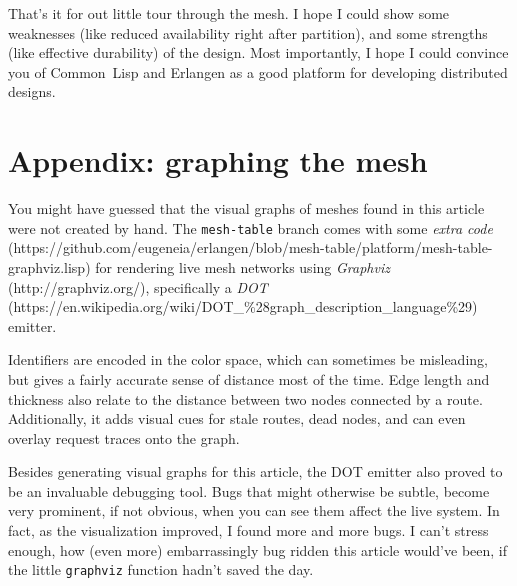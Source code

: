 \documentclass [a4paper,12pt,oneside]{article}\usepackage [paper=a4paper,left=37.5264mm,right=37.5264mm,top=37.5264mm,bottom=37.5264mm]{geometry}\usepackage {graphicx}\usepackage {tabularx}\usepackage {alltt}\usepackage {float}\usepackage [section]{placeins}\usepackage {titling}\setlength {\droptitle }{-4em}\pretitle {\begin {flushright}\bfseries \LARGE }\posttitle {\end {flushright}}\preauthor {\begin {flushright}}\postauthor {\end {flushright}}\predate {\begin {flushright}}\postdate {\end {flushright}}\usepackage [english]{babel}\usepackage [T1]{fontenc}\usepackage [utf8x]{inputenc}\usepackage {stmaryrd}\usepackage {amsfonts}\DeclareUnicodeCharacter {12314}{$\llbracket $}\DeclareUnicodeCharacter {12315}{$\rrbracket $}\DeclareUnicodeCharacter {9655}{$\rhd $}\newcommand \nobreakdash {\mbox {-}}\DeclareUnicodeCharacter {8209}{\nobreakdash }\usepackage [sc]{mathpazo}\linespread {1.05}\usepackage [font={small},labelformat=empty,labelsep=none]{caption}\tolerance=10000 \clubpenalty=10000 \widowpenalty=10000 \frenchspacing
\begin{document}
That’s it for out little tour through the mesh. I hope I could show some weaknesses (like reduced availability right after partition), and some strengths (like effective durability) of the design. Most importantly, I hope I could convince you of Common Lisp and Erlangen as a good platform for developing distributed designs.



\section* {Appendix: graphing the mesh}

You might have guessed that the visual graphs of meshes found in this article were not created by hand. The \texttt {mesh-table} branch comes with some \textit {extra code} (\textsf {https:/\allowbreak /\allowbreak github.com/\allowbreak eugeneia/\allowbreak erlangen/\allowbreak blob/\allowbreak mesh-table/\allowbreak platform/\allowbreak mesh-table-graphviz.lisp}) for rendering live mesh networks using \textit {Graphviz} (\textsf {http:/\allowbreak /\allowbreak graphviz.org/\allowbreak }), specifically a \textit {DOT} (\textsf {https:/\allowbreak /\allowbreak en.wikipedia.org/\allowbreak wiki/\allowbreak DOT\_\%28graph\_description\_language\%29}) emitter.

Identifiers are encoded in the color space, which can sometimes be misleading, but gives a fairly accurate sense of distance most of the time. Edge length and thickness also relate to the distance between two nodes connected by a route. Additionally, it adds visual cues for stale routes, dead nodes, and can even overlay request traces onto the graph.

Besides generating visual graphs for this article, the DOT emitter also proved to be an invaluable debugging tool. Bugs that might otherwise be subtle, become very prominent, if not obvious, when you can see them affect the live system. In fact, as the visualization improved, I found more and more bugs. I can’t stress enough, how (even more) embarrassingly bug ridden this article would’ve been, if the little \texttt {graphviz} function hadn’t saved the day.
\end{document}
